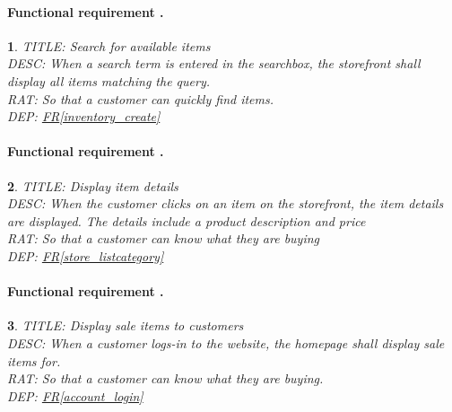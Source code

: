 \documentclass{scrreprt}
\theoremstyle{funreq}
\newtheorem{funreq}{}
\newcommand*{\reqref}[1]{\hyperref[#1]{FR\ref*{#1}}}
\begin{document}
	\paragraph[]{Functional requirement .}
	\begin{funreq}
		\label{store_search}
		TITLE: Search for available items\\
		DESC: When a search term is entered in the searchbox, the storefront shall display all items matching the query.\\
		RAT: So that a customer can quickly find items.\\
		DEP: \reqref{inventory_create}\\
	\end{funreq}
	
	\paragraph[]{Functional requirement .}
	\begin{funreq}
		\label{store_details}
		TITLE: Display item details\\
		DESC: When the customer clicks on an item on the storefront, the item details are displayed.  The details include a product description and price\\
		RAT: So that a customer can know what they are buying\\
		DEP: \reqref{store_listcategory}\\
	\end{funreq}
	
	\paragraph[]{Functional requirement .}
	\begin{funreq}
		\label{store_displaysales}
		TITLE: Display sale items to customers\\
		DESC: When a customer logs-in to the website, the homepage shall display sale items for.\\
		RAT: So that a customer can know what they are buying.\\
		DEP: \reqref{account_login}\\
	\end{funreq}
	
\end{document}
